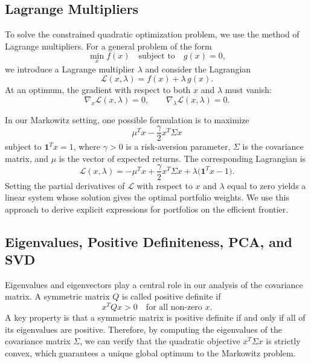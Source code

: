 \documentclass[12pt]{article}
\begin{document}
\subsection{Lagrange Multipliers}

To solve the constrained quadratic optimization problem, we use the method of Lagrange multipliers. For a general problem of the form
\begin{equation}
    \min_{x} f(x) 
    \quad \text{subject to} \quad g(x) = 0,
\end{equation}
we introduce a Lagrange multiplier $\lambda$ and consider the Lagrangian
\begin{equation}
    \mathcal{L}(x,\lambda) = f(x) + \lambda \, g(x).
\end{equation}
At an optimum, the gradient with respect to both $x$ and $\lambda$ must vanish:
\begin{equation}
    \nabla_{x} \mathcal{L}(x,\lambda) = 0,
    \qquad
    \nabla_{\lambda} \mathcal{L}(x,\lambda) = 0.
\end{equation}

In our Markowitz setting, one possible formulation is to maximize
\begin{equation}
    \mu^{T} x - \frac{\gamma}{2} x^{T} \Sigma x
\end{equation}
subject to $\mathbf{1}^{T} x = 1$, where $\gamma > 0$ is a risk-aversion parameter, $\Sigma$ is the covariance matrix, and $\mu$ is the vector of expected returns. The corresponding Lagrangian is
\begin{equation}
    \mathcal{L}(x,\lambda) 
    = -\mu^{T} x + \frac{\gamma}{2} x^{T} \Sigma x 
    + \lambda \big( \mathbf{1}^{T} x - 1 \big).
\end{equation}
Setting the partial derivatives of $\mathcal{L}$ with respect to $x$ and $\lambda$ equal to zero yields a linear system whose solution gives the optimal portfolio weights. We use this approach to derive explicit expressions for portfolios on the efficient frontier.

\subsection{Eigenvalues, Positive Definiteness, PCA, and SVD}

Eigenvalues and eigenvectors play a central role in our analysis of the covariance matrix. A symmetric matrix $Q$ is called positive definite if
\begin{equation}
    x^{T} Q x > 0 \quad \text{for all non-zero } x.
\end{equation}
A key property is that a symmetric matrix is positive definite if and only if all of its eigenvalues are positive. Therefore, by computing the eigenvalues of the covariance matrix $\Sigma$, we can verify that the quadratic objective $x^{T} \Sigma x$ is strictly convex, which guarantees a unique global optimum to the Markowitz problem.
\end{document}
